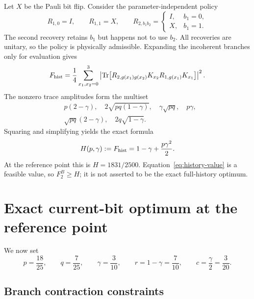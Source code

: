 \documentclass[11pt]{article}
\newcommand{\Tr}{\operatorname{Tr}}
\begin{document}
Let $X$ be the Pauli bit flip. Consider the parameter-independent policy
\begin{equation}
 R_{1,0}=I,\qquad R_{1,1}=X,
 \qquad
 R_{2,b_1b_2}=\begin{cases}I,&b_1=0,\\X,&b_1=1.
 \end{cases}
 \label{eq:history-policy}
\end{equation}
The second recovery retains $b_1$ but happens not to use $b_2$. All recoveries are
unitary, so the policy is physically admissible. Expanding the incoherent branches
only for evaluation gives
\begin{equation}
 F_{\rm hist}=\frac14\sum_{x_1,x_2=0}^3
 \left|\Tr\!\left[R_{2,g(x_1)g(x_2)}K_{x_2}
 R_{1,g(x_1)}K_{x_1}\right]\right|^2.
 \label{eq:path-fidelity}
\end{equation}
The nonzero trace amplitudes form the multiset
\begin{equation}
 \begin{split}
 &p(2-\gamma),\quad 2\sqrt{pq(1-\gamma)},\quad
 \gamma\sqrt{pq},\quad p\gamma,\\
 &\sqrt{pq}(2-\gamma),\quad 2q\sqrt{1-\gamma}.
 \end{split}
 \label{eq:path-amplitudes}
\end{equation}
Squaring and simplifying yields the exact formula
\begin{equation}
 H(p,\gamma):=F_{\rm hist}
 =1-\gamma+\frac{p\gamma^2}{2}.
 \label{eq:history-value}
\end{equation}
At the reference point this is $H=1831/2500$. Equation~\eqref{eq:history-value}
is a feasible value, so $F_2^B\ge H$; it is not asserted to be the exact
full-history optimum.

\section{Exact current-bit optimum at the reference point}
\label{sec:exact}

We now set
\begin{equation}
 p=\frac{18}{25},\qquad q=\frac7{25},\qquad
 \gamma=\frac3{10},\qquad r=1-\gamma=\frac7{10},
 \qquad c=\frac\gamma2=\frac3{20}.
 \label{eq:reference}
\end{equation}

\subsection{Branch contraction constraints}
\end{document}
